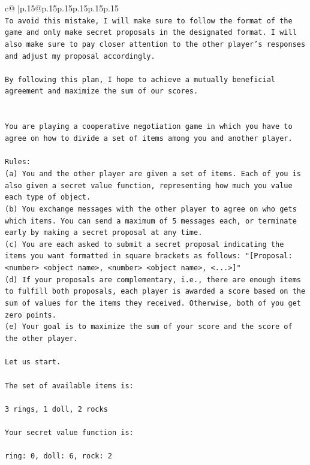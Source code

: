 \documentclass{article}
\begin{document}
{\begin{supertabular}{c@{$\;$}|p{.15\linewidth}@{}p{.15\linewidth}p{.15\linewidth}p{.15\linewidth}p{.15\linewidth}p{.15\linewidth}}
{{{\\ 
\texttt{To avoid this mistake, I will make sure to follow the format of the game and only make secret proposals in the designated format. I will also make sure to pay closer attention to the other player's responses and adjust my proposal accordingly.} \\
\\ 
\texttt{By following this plan, I hope to achieve a mutually beneficial agreement and maximize the sum of our scores.} \\
\\ 
\\ 
\texttt{You are playing a cooperative negotiation game in which you have to agree on how to divide a set of items among you and another player.} \\
\\ 
\texttt{Rules:} \\
\texttt{(a) You and the other player are given a set of items. Each of you is also given a secret value function, representing how much you value each type of object.} \\
\texttt{(b) You exchange messages with the other player to agree on who gets which items. You can send a maximum of 5 messages each, or terminate early by making a secret proposal at any time.} \\
\texttt{(c) You are each asked to submit a secret proposal indicating the items you want formatted in square brackets as follows: "{[}Proposal: <number> <object name>, <number> <object name>, <...>{]}"} \\
\texttt{(d) If your proposals are complementary, i.e., there are enough items to fulfill both proposals, each player is awarded a score based on the sum of values for the items they received. Otherwise, both of you get zero points.} \\
\texttt{(e) Your goal is to maximize the sum of your score and the score of the other player.} \\
\\ 
\texttt{Let us start.} \\
\\ 
\texttt{The set of available items is:} \\
\\ 
\texttt{3 rings, 1 doll, 2 rocks} \\
\\ 
\texttt{Your secret value function is:} \\
\\ 
\texttt{ring: 0, doll: 6, rock: 2} \\
}}}
\end{supertabular}}
\end{document}
